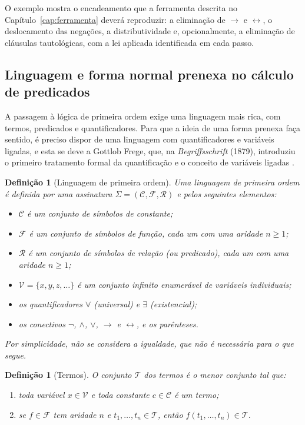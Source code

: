 \documentclass[12pt,a4paper,oneside]{report}
\theoremstyle{tituloplain}
\theoremstyle{titulodef}
\newtheorem{definicao}[teorema]{Definição}
\begin{document}
O exemplo mostra o encadeamento que a ferramenta descrita no Capítulo~\ref{cap:ferramenta} deverá reproduzir: a eliminação de $\rightarrow$ e $\leftrightarrow$, o deslocamento das negações, a distributividade e, opcionalmente, a eliminação de cláusulas tautológicas, com a lei aplicada identificada em cada passo.

\subsection{Linguagem e forma normal prenexa no cálculo de predicados}\label{sec:primeira-ordem}

A passagem à lógica de primeira ordem exige uma linguagem mais rica, com termos, predicados e quantificadores. Para que a ideia de uma forma prenexa faça sentido, é preciso dispor de uma linguagem com quantificadores e variáveis ligadas, e esta se deve a Gottlob Frege, que, na \textit{Begriffsschrift} (1879), introduziu o primeiro tratamento formal da quantificação e o conceito de variáveis ligadas \cite{frege1879,ewald2018}.

\begin{definicao}[Linguagem de primeira ordem]\label{def:linguagem-fo}
Uma \emph{linguagem de primeira ordem} é definida por uma assinatura $\Sigma=(\mathcal{C},\mathcal{F},\mathcal{R})$ e pelos seguintes elementos:
\begin{itemize}
  \item $\mathcal{C}$ é um conjunto de símbolos de \emph{constante};
  \item $\mathcal{F}$ é um conjunto de símbolos de \emph{função}, cada um com uma aridade $n\geq 1$;
  \item $\mathcal{R}$ é um conjunto de símbolos de \emph{relação} (ou \emph{predicado}), cada um com uma aridade $n\geq 1$;
  \item $\mathcal{V}=\{x,y,z,\dots\}$ é um conjunto infinito enumerável de \emph{variáveis individuais};
  \item os \emph{quantificadores} $\forall$ (universal) e $\exists$ (existencial);
  \item os \emph{conectivos} $\neg$, $\wedge$, $\vee$, $\rightarrow$ e $\leftrightarrow$, e os parênteses.
\end{itemize}
Por simplicidade, não se considera a igualdade, que não é necessária para o que segue.
\end{definicao}

\begin{definicao}[Termos]\label{def:termos}
O conjunto $\mathcal{T}$ dos \emph{termos} é o menor conjunto tal que:
\begin{enumerate}
  \item toda variável $x\in\mathcal{V}$ e toda constante $c\in\mathcal{C}$ é um termo;
  \item se $f\in\mathcal{F}$ tem aridade $n$ e $t_1,\dots,t_n\in\mathcal{T}$, então $f(t_1,\dots,t_n)\in\mathcal{T}$.
\end{enumerate}
\end{definicao}
\end{document}
